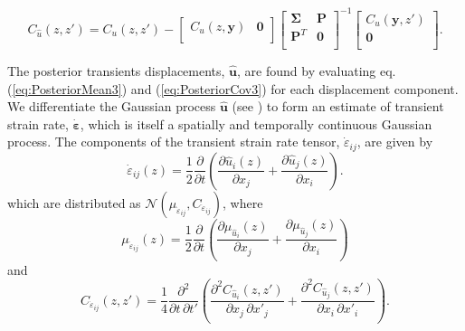\documentclass[10pt,letter]{article}
\begin{document}
\begin{equation}\label{eq:PosteriorCov3}
C_{\hat{u}}(z,z') = C_u(z,z') - 
                    \left[\begin{array}{cc}
                          C_u(z,\bm{y}) & \bm{0} \\
                          \end{array}\right]
                    \left[\begin{array}{cc}
                          \bm{\Sigma} & \bm{P} \\
                          \bm{P}^T  & \bm{0} \\
                          \end{array}\right]^{-1}
                    \left[\begin{array}{c}
                          C_u(\bm{y},z') \\
                          \bm{0} \\
                          \end{array}\right].
\end{equation}

The posterior transients displacements, $\hat{\bm{u}}$, are found by evaluating eq. (\ref{eq:PosteriorMean3}) and (\ref{eq:PosteriorCov3}) for each displacement component. We differentiate the Gaussian process $\hat{\bm{u}}$ (see \cite{Abrahamsen1997}) to form an estimate of transient strain rate, $\dot{\bm{\varepsilon}}$, which is itself a spatially and temporally continuous Gaussian process. The components of the transient strain rate tensor, $\dot{\varepsilon}_{ij}$, are given by
\begin{equation}\label{eq:StrainRate}
\dot{\varepsilon}_{ij}(z) = \frac{1}{2} \frac{\partial}{\partial t} \left(
                                        \frac{\partial \hat{u}_i(z)}{\partial x_j} +  
                                        \frac{\partial \hat{u}_j(z)}{\partial x_i}\right).
\end{equation}
which are distributed as $\mathcal{N}(\mu_{\dot{\varepsilon}_{ij}},C_{\dot{\varepsilon}_{ij}})$, where
\begin{equation}\label{eq:StrainMean}
\mu_{\dot{\varepsilon}_{ij}}(z) = \frac{1}{2}\frac{\partial}{\partial t}\left(
                                  \frac{\partial \mu_{\hat{u}_i}(z)}{\partial x_j} + 
                                  \frac{\partial \mu_{\hat{u}_j}(z)}{\partial x_i} \right)
\end{equation} 
and  
\begin{equation}\label{eq:StrainCov}
C_{\dot{\varepsilon}_{ij}}(z,z') = \frac{1}{4} \frac{\partial^2}{\partial t \, \partial t'}\left(
                                   \frac{\partial^2 C_{\hat{u}_i}(z,z')}{\partial x_j \, \partial x'_j} + 
                                   \frac{\partial^2 C_{\hat{u}_j}(z,z')}{\partial x_i \, \partial x'_i} \right).
\end{equation} 
\end{document}
